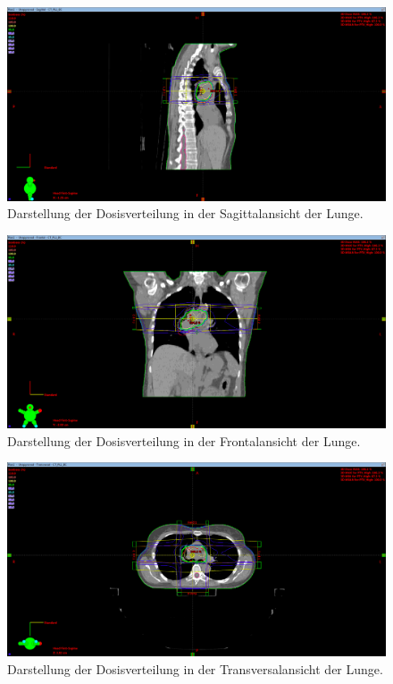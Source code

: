 \begin{figure}
	\centering
	\includegraphics[width=0.7\linewidth]{../../Bilder/Lunge2_X}
	\caption{Darstellung der Dosisverteilung in der Sagittalansicht der Lunge.}
	\label{fig:lunge2x}
\end{figure}

\begin{figure}
	\centering
	\includegraphics[width=0.7\linewidth]{../../Bilder/Lunge2_Y}
	\caption{Darstellung der Dosisverteilung in der Frontalansicht der Lunge.}
	\label{fig:lunge2y}
\end{figure}

\begin{figure}
	\centering
	\includegraphics[width=0.7\linewidth]{../../Bilder/Lunge2_Z}
	\caption{Darstellung der Dosisverteilung in der Transversalansicht der Lunge.}
	\label{fig:lunge2z}
\end{figure}


